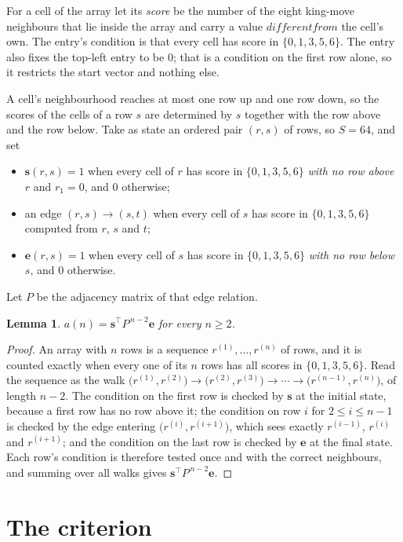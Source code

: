\documentclass[11pt,a4paper]{article}
\theoremstyle{plain}
\newtheorem{lemma}[theorem]{Lemma}
\theoremstyle{definition}
\begin{document}
For a cell of the array let its \emph{score} be the number of the eight king-move neighbours that lie inside
the array and carry a value $different from$ the cell's own. The entry's condition is that every cell
has score in $\{0,1,3,5,6\}$. The entry also fixes the top-left entry to be $0$; that is a condition on the first row alone, so it restricts the start vector and nothing else.

A cell's neighbourhood reaches at most one row up and one row down, so the scores of the
cells of a row $s$ are determined by $s$ together with the row above and the row below.
Take as state an ordered pair $(r,s)$ of rows, so $S=64$, and set
\begin{itemize}
\item $\mathbf{s}(r,s)=1$ when every cell of $r$ has score in $\{0,1,3,5,6\}$ \emph{with no row
above $r$} and $r_1=0$, and $0$ otherwise;
\item an edge $(r,s)\to(s,t)$ when every cell of $s$ has score in $\{0,1,3,5,6\}$ computed from
$r$, $s$ and $t$;
\item $\mathbf{e}(r,s)=1$ when every cell of $s$ has score in $\{0,1,3,5,6\}$ \emph{with no row
below $s$}, and $0$ otherwise.
\end{itemize}
Let $P$ be the adjacency matrix of that edge relation.

\begin{lemma}\label{lem:walk}
$a(n)=\mathbf{s}^{\!\top}P^{\,n-2}\mathbf{e}$ for every $n\ge2$.
\end{lemma}

\begin{proof}
An array with $n$ rows is a sequence $r^{(1)},\dots,r^{(n)}$ of rows, and it is counted
exactly when every one of its $n$ rows has all scores in $\{0,1,3,5,6\}$. Read the sequence as the
walk $\bigl(r^{(1)},r^{(2)}\bigr)\to\bigl(r^{(2)},r^{(3)}\bigr)\to\cdots\to
\bigl(r^{(n-1)},r^{(n)}\bigr)$, of length $n-2$. The condition on the first row is
checked by $\mathbf{s}$ at the initial state, because a first row has no row above it; the
condition on row $i$ for $2\le i\le n-1$ is checked by the edge entering
$\bigl(r^{(i)},r^{(i+1)}\bigr)$, which sees exactly $r^{(i-1)}$, $r^{(i)}$ and
$r^{(i+1)}$; and the condition on the last row is checked by $\mathbf{e}$ at the final
state. Each row's condition is therefore tested once and with the correct neighbours, and
summing over all walks gives $\mathbf{s}^{\!\top}P^{\,n-2}\mathbf{e}$.
\end{proof}

\section{The criterion}
\end{document}

